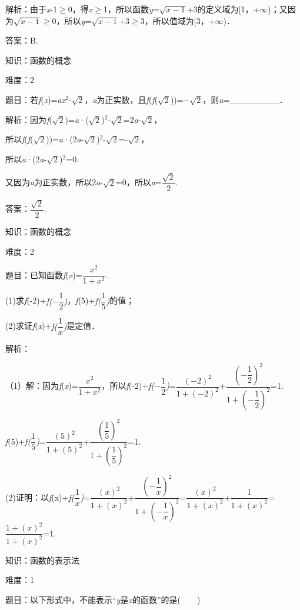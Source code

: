 \documentclass{article} %
\begin{document}
解析：由于\textit{x}-1$\mathrm{\ge}$0，得\textit{x}$\mathrm{\ge}$1，所以函数\textit{y}=$\sqrt{x-1}$+3的定义域为[1，+$\mathrm{\infty}$)；又因为$\sqrt{x-1}$$\mathrm{\ge}$0，所以\textit{y}=$\sqrt{x-1}$+3$\mathrm{\ge}$3，所以值域为[3，+$\mathrm{\infty}$)．

答案：B.

知识：函数的概念

难度：2

题目：若\textit{f}(\textit{x})=\textit{ax}${}^{2}$-$\sqrt{2}$，\textit{a}为正实数，且\textit{f}(\textit{f}($\sqrt{2}$))=$-\sqrt{2}$，则\textit{a}=\_\_\_\_\_\_\_\_．

解析：因为\textit{f}($\sqrt{2}$)=\textit{a}·($\sqrt{2}$)${}^{2}$-$\sqrt{2}$=2\textit{a}-$\sqrt{2}$，

所以\textit{f}(\textit{f}($\sqrt{2}$))=\textit{a}·(2\textit{a}-$\sqrt{2}$)${}^{2}$-$\sqrt{2}$=-$\sqrt{2}$，

所以\textit{a}·(2\textit{a}-$\sqrt{2}$)${}^{2}$=0.

又因为\textit{a}为正实数，所以2\textit{a}-$\sqrt{2}$=0，所以\textit{a}=$\dfrac{\sqrt{2}}{2}$.

答案：$\dfrac{\sqrt{2}}{2}$.

知识：函数的概念

难度：2

题目：已知函数\textit{f}(\textit{x})=$\dfrac{x^{2}}{1+x^{2}}$.

(1)求\textit{f}(-2)+\textit{f($-\dfrac{1}{2}$)}，\textit{f}(5)+\textit{f($\dfrac{1}{5}$)}的值；

(2)求证\textit{f}(\textit{x})+\textit{f($\dfrac{1}{x}$)}是定值．

解析：

（1）解：因为\textit{f}(\textit{x})=$\dfrac{x^{2}}{1+x^{2}}$，所以\textit{f}(-2)+\textit{f($-\dfrac{1}{2}$)}=$\dfrac{(-2)^{2}}{1+(-2)^{2}}$+$\dfrac{(-\dfrac{1}{2})^{2}}{1+(-\dfrac{1}{2})^{2}}$=1.

\textit{f}(5)+\textit{f($\dfrac{1}{5}$)}=$\dfrac{(5)^{2}}{1+(5)^{2}}$+$\dfrac{(\dfrac{1}{5})^{2}}{1+(\dfrac{1}{5})^{2}}$=1.

(2)证明：以\textit{f}(x)+\textit{f($\dfrac{1}{x}$)}=$\dfrac{(x)^{2}}{1+(x)^{2}}$+$\dfrac{(-\dfrac{1}{x})^{2}}{1+(-\dfrac{1}{x})^{2}}$=$\dfrac{(x)^{2}}{1+(x)^{2}}$+$\dfrac{1}{1+(x)^{2}}$=$\dfrac{1+(x)^{2}}{1+(x)^{2}}$=1.

知识：函数的表示法

难度：1

题目：以下形式中，不能表示``\textit{y}是\textit{x}的函数''的是(　　)
\end{document}
